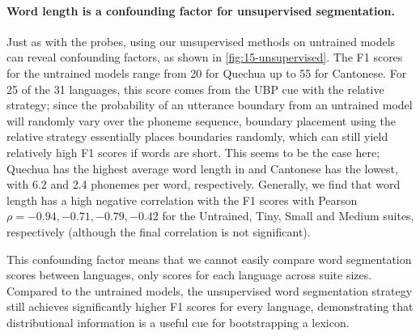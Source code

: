 

\paragraph{Word length is a confounding factor for unsupervised segmentation.}
Just as with the probes, using our unsupervised methods on untrained models can reveal confounding factors, as shown in \cref{fig:15-unsupervised}. The F1 scores for the untrained models range from 20 for Quechua up to 55 for Cantonese. For 25 of the 31 languages, this score comes from the UBP cue with the relative strategy; since the probability of an utterance boundary from an untrained model will randomly vary over the phoneme sequence, boundary placement using the relative strategy essentially places boundaries randomly, which can still yield relatively high F1 scores if words are short. This seems to be the case here; Quechua has the highest average word length in \ipachildes and Cantonese has the lowest, with 6.2 and 2.4 phonemes per word, respectively. Generally, we find that word length has a high negative correlation with the F1 scores with Pearson $\rho = -0.94, -0.71, -0.79, -0.42$ for the Untrained, Tiny, Small and Medium suites, respectively (although the final correlation is not significant). 

This confounding factor means that we cannot easily compare word segmentation scores between languages, only scores for each language across suite sizes. Compared to the untrained models, the unsupervised word segmentation strategy still achieves significantly higher F1 scores for every language, demonstrating that distributional information is a useful cue for bootstrapping a lexicon. 

